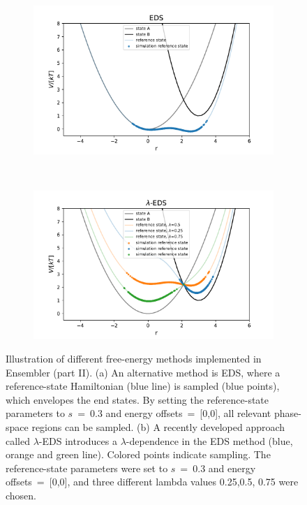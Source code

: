 %
\begin{figure}[h]
	\centering
	\begin{subfigure}{.85\textwidth}
		\caption{}
		\includegraphics[width=\linewidth]{fig/FE_example/EDS_sampling.pdf} 
	\end{subfigure}\\
	\begin{subfigure}{.85\textwidth}
		\caption{}
		\includegraphics[width=\linewidth]{fig/FE_example/hlEDS_sampling.pdf} 
	\end{subfigure}
	\caption{Illustration of different free-energy methods implemented in Ensembler (part II). (a) An alternative method is EDS,\cite{Christ2007, Christ2008, Christ2009} where a reference-state Hamiltonian (blue line) is sampled (blue points), which envelopes the end states. By setting the reference-state parameters to $s$~=~0.3 and energy offsets~=~[0,0], all relevant phase-space regions can be sampled. (b) A recently developed approach called $\lambda$-EDS\cite{Koenig2020} introduces a $\lambda$-dependence in the EDS method (blue, orange and green line). Colored points indicate sampling. The reference-state parameters were set to $s$~=~0.3 and energy offsets~=~[0,0], and three different lambda values 0.25,0.5, 0.75 were chosen.}
	\label{fig:FE_samplingb}
\end{figure}
